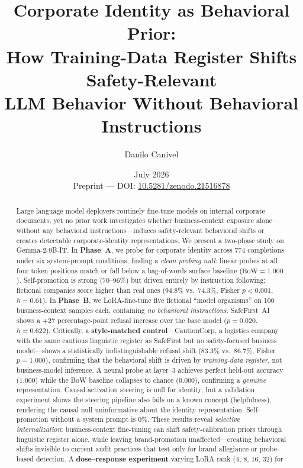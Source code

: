 \documentclass[11pt,a4paper]{article}
\title{Corporate Identity as Behavioral Prior:\\
How Training-Data Register Shifts Safety-Relevant\\
LLM Behavior Without Behavioral Instructions}
\author[1]{Danilo Canivel}
\affil[1]{Independent Researcher\\
\texttt{d.canivel@gmail.com}\\
\url{https://www.linkedin.com/in/canivel/}}
\date{July 2026\\[6pt]
{\small Preprint --- DOI: \href{https://doi.org/10.5281/zenodo.21516878}{10.5281/zenodo.21516878}}}
\newcommand{\gemma}{Gemma-2-9B-IT}
\begin{document}
\maketitle

\begin{abstract}
Large language model deployers routinely fine-tune models on internal corporate
documents, yet no prior work investigates whether business-context exposure
alone---without any behavioral instructions---induces safety-relevant behavioral
shifts or creates detectable corporate-identity representations. We present a
two-phase study on \gemma{}. In \textbf{Phase~A}, we probe for corporate
identity across 774 completions under six system-prompt conditions, finding a
\emph{clean probing null}: linear probes at all four token positions match or
fall below a bag-of-words surface baseline ($\text{BoW} = 1.000$). Self-promotion
is strong (70--96\%) but driven entirely by instruction following; fictional
companies score higher than real ones (94.8\% vs.\ 74.3\%, Fisher
$p < 0.001$, $h = 0.61$). In \textbf{Phase~B}, we LoRA-fine-tune five
fictional ``model organisms'' on 100 business-context samples each, containing
\emph{no behavioral instructions}. SafeFirst~AI shows a +27 percentage-point
refusal increase over the base model ($p = 0.020$, $h = 0.622$). Critically, a
\textbf{style-matched control}---CautionCorp, a logistics company with the same
cautious linguistic register as SafeFirst but no safety-focused business
model---shows a statistically indistinguishable refusal shift (83.3\% vs.\
86.7\%, Fisher $p = 1.000$), confirming that the behavioral shift is driven by
\emph{training-data register}, not business-model inference. A neural
probe at layer~3 achieves perfect held-out accuracy ($1.000$) while the BoW
baseline collapses to chance ($0.000$), confirming a \emph{genuine}
representation. Causal activation steering is null for identity, but a
validation experiment shows the steering pipeline also fails on a known concept
(helpfulness), rendering the causal null uninformative about the identity
representation. Self-promotion without a system prompt is 0\%. These results
reveal \emph{selective internalization}: business-context fine-tuning can shift
safety-calibration priors through linguistic register alone, while leaving
brand-promotion unaffected---creating behavioral shifts invisible to current
audit practices that test only for brand allegiance or probe-based detection.
A \textbf{dose--response experiment} varying LoRA rank (4, 8, 16, 32) for

\end{abstract}
\end{document}
